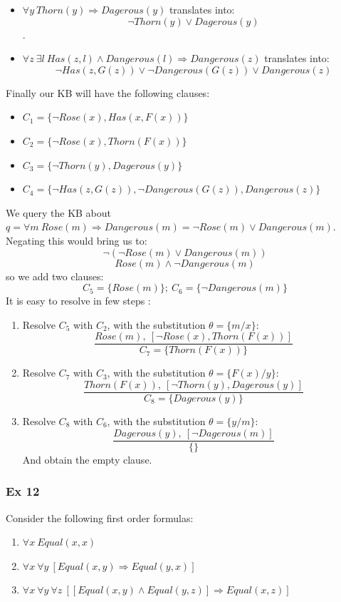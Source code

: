 \documentclass[10pt,a4paper]{article}
\begin{document}
\begin{itemize}
\begin{itemize}
\begin{itemize}
\end{itemize}
\item $\forall y\ Thorn(y) \Rightarrow Dagerous(y)$ translates into:
\[\neg Thorn(y) \vee Dagerous(y)\].
\item $\forall z\ \exists l\ Has(z,l)\wedge Dangerous(l) \Rightarrow Dangerous(z)$ translates into:
\[\neg Has(z,G(z))\vee \neg Dangerous(G(z)) \vee Dangerous(z)\]

\end{itemize}

Finally our KB will have the following clauses:
\begin{itemize}
\item $C_1=\lbrace \neg Rose(x) , Has(x,F(x))\rbrace$
\item $C_2=\lbrace \neg Rose(x) , Thorn(F(x)) \rbrace$
\item $C_3=\lbrace \neg Thorn(y), Dagerous(y) \rbrace$
\item $C_4=\lbrace \neg Has(z,G(z)), \neg Dangerous(G(z)) , Dangerous(z) \rbrace$
\end{itemize}
We query the KB about $q=\forall m\ Rose(m) \Rightarrow Dangerous(m)=\neg Rose(m) \vee Dangerous(m)$. Negating this would bring us to:
\[\neg (\neg Rose(m) \vee Dangerous(m))\]
\[  Rose(m) \wedge \neg Dangerous(m)\]
 so we add two clauses:
\[C_5=\lbrace  Rose(m)\rbrace;\ C_6=\lbrace \neg  Dangerous(m)\rbrace\]
It is easy to resolve in few steps :
\begin{enumerate}
\item Resolve $C_5$ with $C_2$, with the substitution $\theta=\lbrace m/x \rbrace$:
\[\frac{Rose(m),\ [\neg Rose(x),Thorn(F(x))]}{C_7=\lbrace Thorn(F(x)) \rbrace}\]
\item Resolve $C_7$ with $C_3$, with the substitution $\theta=\lbrace F(x)/y \rbrace$:
\[\frac{Thorn(F(x)),\ [\neg Thorn(y), Dagerous(y)]}{C_8=\lbrace Dagerous(y) \rbrace}\]
\item Resolve $C_8$ with $C_6$, with the substitution $\theta=\lbrace y/m \rbrace$:
\[\frac{Dagerous(y) ,\ [\neg Dagerous(m) ]}{\lbrace \rbrace}\]
And obtain the empty clause.
\end{enumerate}

\subsubsection{Ex 12}
Consider the following first order formulas:
\begin{enumerate}
\item $\forall x\ Equal(x,x)$
\item $\forall x\ \forall y\ [Equal(x,y) \Rightarrow Equal(y,x)]$
\item $\forall x\ \forall y\ \forall z\ [[Equal(x,y)\wedge Equal(y,z)]\Rightarrow Equal(x,z)]$
\end{enumerate}


\end{itemize}
\end{document}
